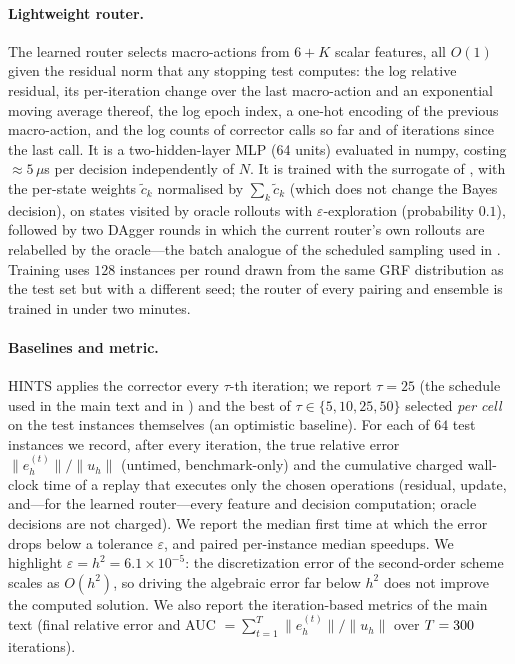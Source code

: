 \paragraph{Lightweight router.} The learned router selects macro-actions from $6 + K$ scalar features, all $O(1)$ given the residual norm that any stopping test computes: the log relative residual, its per-iteration change over the last macro-action and an exponential moving average thereof, the log epoch index, a one-hot encoding of the previous macro-action, and the log counts of corrector calls so far and of iterations since the last call. It is a two-hidden-layer MLP (64 units) evaluated in numpy, costing $\approx 5\,\mu$s per decision independently of $N$. It is trained with the surrogate of , with the per-state weights $\tilde c_k$ normalised by $\sum_k \tilde c_k$ (which does not change the Bayes decision), on states visited by oracle rollouts with $\varepsilon$-exploration (probability $0.1$), followed by two DAgger rounds \citep{ross2011reduction} in which the current router's own rollouts are relabelled by the oracle---the batch analogue of the scheduled sampling used in . Training uses $128$ instances per round drawn from the same GRF distribution as the test set but with a different seed; the router of every pairing and ensemble is trained in under two minutes.

\paragraph{Baselines and metric.} HINTS applies the corrector every $\tau$-th iteration; we report $\tau = 25$ (the schedule used in the main text and in \citet{zhang2024blending}) and the best of $\tau \in \{5, 10, 25, 50\}$ selected \emph{per cell} on the test instances themselves (an optimistic baseline). For each of $64$ test instances we record, after every iteration, the true relative error $\|e^{(t)}_h\|/\|u_h\|$ (untimed, benchmark-only) and the cumulative charged wall-clock time of a replay that executes only the chosen operations (residual, update, and---for the learned router---every feature and decision computation; oracle decisions are not charged). We report the median first time at which the error drops below a tolerance $\varepsilon$, and paired per-instance median speedups. We highlight $\varepsilon = h^2 = 6.1\times 10^{-5}$: the discretization error of the second-order scheme scales as $O(h^2)$, so driving the algebraic error far below $h^2$ does not improve the computed solution. We also report the iteration-based metrics of the main text (final relative error and AUC $=\sum_{t=1}^{T}\|e^{(t)}_h\|/\|u_h\|$ over $T = 300$ iterations).

